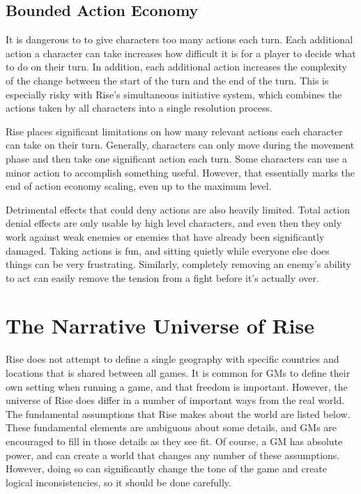     \subsection{Bounded Action Economy}
        It is dangerous to to give characters too many actions each turn.
        Each additional action a character can take increases how difficult it is for a player to decide what to do on their turn.
        In addition, each additional action increases the complexity of the change between the start of the turn and the end of the turn.
        This is especially risky with Rise's simultaneous initiative system, which combines the actions taken by all characters into a single resolution process.

        Rise places significant limitations on how many relevant actions each character can take on their turn.
        Generally, characters can only move during the movement phase and then take one significant action each turn.
        Some characters can use a minor action to accomplish something useful.
        However, that essentially marks the end of action economy scaling, even up to the maximum level.

        Detrimental effects that could deny actions are also heavily limited.
        Total action denial effects are only usable by high level characters, and even then they only work against weak enemies or enemies that have already been significantly damaged.
        Taking actions is fun, and sitting quietly while everyone else does things can be very frustrating.
        Similarly, completely removing an enemy's ability to act can easily remove the tension from a fight before it's actually over.

\section{The Narrative Universe of Rise}
    Rise does not attempt to define a single geography with specific countries and locations that is shared between all games.
    It is common for GMs to define their own setting when running a game, and that freedom is important.
    However, the universe of Rise does differ in a number of important ways from the real world.
    The fundamental assumptions that Rise makes about the world are listed below.
    These fundamental elements are ambiguous about some details, and GMs are encouraged to fill in those details as they see fit.
    Of course, a GM has absolute power, and can create a world that changes any number of these assumptions.
    However, doing so can significantly change the tone of the game and create logical inconsistencies, so it should be done carefully.

